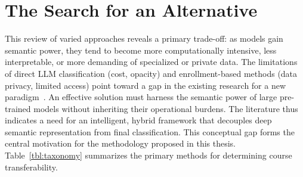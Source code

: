 \section{The Search for an Alternative}
This review of varied approaches reveals a primary trade-off: as models gain semantic power, they tend to become more computationally intensive, less interpretable, or more demanding of specialized or private data.  The limitations of direct LLM classification (cost, opacity) and enrollment-based methods (data privacy, limited access) point toward a gap in the existing research for a new paradigm~\cite{pardos-articulation-2019, slade10.1177/0002764213479366}.
An effective solution must harness the semantic power of large pre-trained models without inheriting their operational burdens.  The literature thus indicates a need for an intelligent, hybrid framework that decouples deep semantic representation from final classification.  This conceptual gap forms the central motivation for the methodology proposed in this thesis.  Table~\ref{tbl:taxonomy} summarizes the primary methods for determining course transferability.

